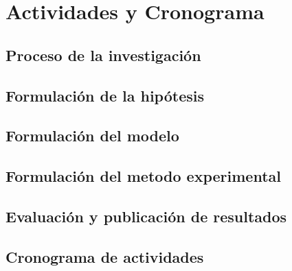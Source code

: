 \chapter{Actividades y Cronograma}
\label{chap:actividadesYCronograma}
\ifpdf
    \graphicspath{{Chapter3/Chapter3Figs/PNG/}{Chapter3/Chapter3Figs/PDF/}{Chapter3/ChapterFigs/}}
\else
    \graphicspath{{Chapter3/Chapter3Figs/EPS/}{Chapter3/Chapter3Figs/}}
\fi


\section{Proceso de la investigación}

\section{Formulación de la hipótesis}

\section{Formulación del modelo}

\section{Formulación del metodo experimental}

\section{Evaluación y publicación de resultados}

\section{Cronograma de actividades}



